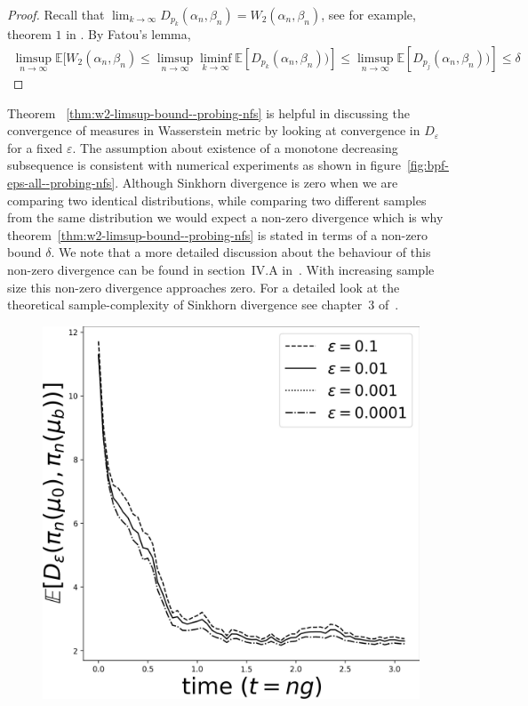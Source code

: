 {\begin{thm}
\begin{proof}
Recall that $\lim_{k\to\infty}D_{p_k} (\alpha_n, \beta_n) = W_2 (\alpha_n, \beta_n)$, see for example, theorem $1$ in \cite{genevay2018learning}. By Fatou's lemma,
\begin{align}
    \limsup_{n\to\infty}\mathbb E[W_2 (\alpha_n, \beta_n) \le \limsup_{n\to\infty}\liminf_{k\to\infty}\mathbb E[D_{p_k}(\alpha_n, \beta_n))] \le  \limsup_{n\to\infty}\mathbb E[D_{p_j}(\alpha_n, \beta_n))]\le\delta
\end{align}
\end{proof}
\label{thm:w2-limsup-bound--probing-nfs}
\end{thm}
Theorem ~\ref{thm:w2-limsup-bound--probing-nfs} is helpful in discussing the convergence of measures in Wasserstein metric by looking at convergence in $D_\varepsilon$ for a fixed $\varepsilon$. The assumption about existence of a monotone decreasing subsequence is consistent with numerical experiments as shown in figure~\ref{fig:bpf-eps-all--probing-nfs}. Although Sinkhorn divergence is zero when we are comparing two identical distributions, while comparing two different samples from the same distribution we would expect a non-zero divergence which is why theorem~\ref{thm:w2-limsup-bound--probing-nfs}  is stated in terms of a non-zero bound $\delta$. We note that a more detailed discussion about the behaviour of this non-zero divergence can be found in section~IV.A in~\cite{mandal2021stability}. With increasing sample size this non-zero divergence approaches zero. For a detailed look at the theoretical sample-complexity of Sinkhorn divergence see chapter~$3$ of~\cite{genevay2019entropy}.
\begin{figure}
    \centering
    \includegraphics[scale=0.15]{stability/plots/plots-bpf-eps_all.jpg}

\end{figure}}
